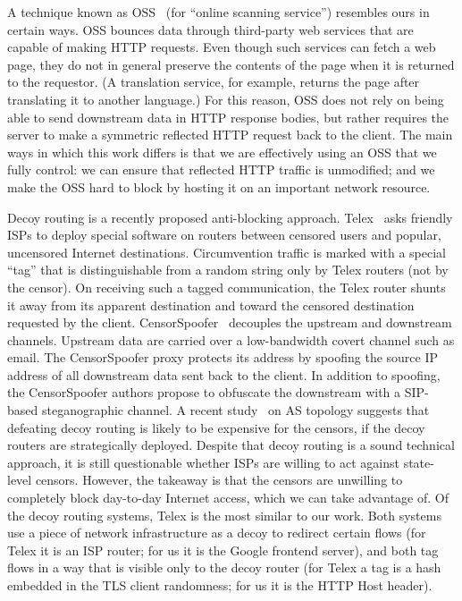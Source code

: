 \documentclass{article}
\begin{document}

A technique known as OSS~\cite{oss} (for
``online scanning service'') resembles ours in certain ways. OSS bounces data
through third-party web services that are capable of making HTTP requests.
Even though such services can fetch a web page, they do not in general
preserve the contents of the page when it is returned to the requestor.
(A translation service, for example,
returns the page after translating it to another language.)
For this reason, OSS does not rely on being able to send downstream data in HTTP response bodies,
but rather requires the server to make a symmetric reflected HTTP request back to the client.
The main ways in which this work differs is that we are effectively using an OSS that we fully control:
we can ensure that reflected HTTP traffic is unmodified;
and we make the OSS hard to block by hosting it on an important network resource.

Decoy routing is
a recently proposed anti-blocking approach. Telex~\cite{telex}
asks friendly ISPs to deploy special software on routers between censored users and
popular, uncensored Internet destinations.
Circumvention traffic is marked with a special ``tag'' that is distinguishable from a random string only
by Telex routers (not by the censor).
On receiving such a tagged communication, the Telex router shunts it away from its apparent destination
and toward the censored destination requested by the client.
CensorSpoofer~\cite{censorspoofer}
decouples the upstream and downstream channels.
Upstream data are carried over a low-bandwidth covert channel such as email.
The CensorSpoofer proxy protects its address by
spoofing the source IP address of all downstream data sent back to the client.
In addition to spoofing, the CensorSpoofer authors propose to obfuscate the downstream with a SIP-based steganographic channel.
A recent study~\cite{nodirectionhome} on AS
topology suggests that defeating decoy routing is likely to be expensive for the
censors, if the decoy routers are strategically deployed. Despite that decoy
routing is a sound technical approach, it is still questionable whether ISPs are
willing to act against state-level censors. However, the takeaway is that the
censors are unwilling to completely block day-to-day Internet access, which we
can take advantage of.
Of the decoy routing systems, Telex is the most similar to our work.
Both systems use a piece of network infrastructure as a decoy to redirect certain flows
(for Telex it is an ISP router; for us it is the Google frontend server),
and both tag flows in a way that is visible only to the decoy router
(for Telex a tag is a hash embedded in the TLS client randomness; for us it is the HTTP Host header).
\end{document}
